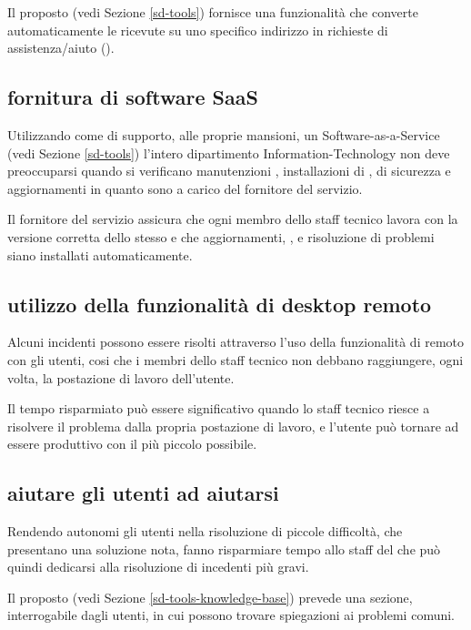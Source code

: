 Il  proposto (vedi Sezione \ref{sd-tools}) fornisce una funzionalità che converte automaticamente le  ricevute su uno specifico indirizzo in richieste di assistenza/aiuto ().

\subsection[Fornitura di software SaaS]{fornitura di software SaaS}
\label{sd-users-experience-saas}
Utilizzando come  di supporto, alle proprie mansioni, un \ac{Software-as-a-Service} (vedi Sezione \ref{sd-tools}) l'intero dipartimento \acs{Information-Technology} non deve preoccuparsi quando si verificano manutenzioni , installazioni di ,  di sicurezza e aggiornamenti  in quanto sono a carico del fornitore del servizio.

Il fornitore del servizio  assicura che ogni membro dello staff tecnico lavora con la versione corretta dello stesso e che aggiornamenti, , e risoluzione di problemi siano installati automaticamente.

\subsection[Utilizzo della funzionalità di desktop remoto]{utilizzo della funzionalità di desktop remoto}
\label{sd-users-experience-remote-desktop}
Alcuni incidenti possono essere risolti attraverso l'uso della funzionalità di  remoto con gli utenti, cosi che i membri dello staff tecnico non debbano raggiungere, ogni volta, la postazione di lavoro dell'utente.

Il tempo risparmiato può essere significativo quando lo staff tecnico riesce a risolvere il problema dalla propria postazione di lavoro, e l'utente può tornare ad essere produttivo con il più piccolo  possibile.

\subsection[Aiutare gli utenti ad aiutarsi]{aiutare gli utenti ad aiutarsi}
\label{sd-user-experience-help}
Rendendo autonomi gli utenti nella risoluzione di piccole difficoltà, che presentano una soluzione nota, fanno risparmiare tempo allo staff del  che può quindi dedicarsi alla risoluzione di incedenti più gravi.

Il  proposto (vedi Sezione \ref{sd-tools-knowledge-base}) prevede una sezione, interrogabile dagli utenti, in cui possono trovare spiegazioni ai problemi comuni.